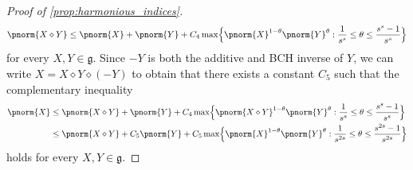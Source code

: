 \begin{proof}[Proof of \cref{prop:harmonious_indices}]
\begin{equation}
\pnorm{X\diamond Y} \leq \pnorm{X}+\pnorm{Y} + C_4\max\Bigl\{\pnorm{X}^{1-\theta}\pnorm{Y}^{\theta}: \frac{1}{s^s} \leq \theta \leq \frac{s^s-1}{s^s} \Bigr\}
\end{equation}
for every $X,Y\in \mathfrak{g}$.  Since $-Y$ is both the additive and BCH inverse of $Y$, we can write $X=X \diamond Y \diamond (-Y)$ to obtain that there exists a constant $C_5$ such that the complementary inequality 
\begin{align}
\pnorm{X} &\leq \pnorm{X\diamond Y}+ \pnorm{Y} + C_4\max\Bigl\{\pnorm{X \diamond Y}^{1-\theta}\pnorm{Y}^{\theta}: \frac{1}{s^s} \leq \theta \leq \frac{s^s-1}{s^s} \Bigr\}
\nonumber
\\
&\leq \pnorm{X\diamond Y}+ C_5\pnorm{Y} + C_5 \max\Bigl\{\pnorm{X}^{1-\theta}\pnorm{Y}^{\theta}: \frac{1}{s^{2s}} \leq \theta \leq \frac{s^{2s}-1}{s^{2s}} \Bigr\}
\label{eq:pnorm_BCH_reverse_triangle}
\end{align}
holds for every $X,Y\in \mathfrak{g}$. 
%
%
%
%
%

\medskip


\end{proof}
